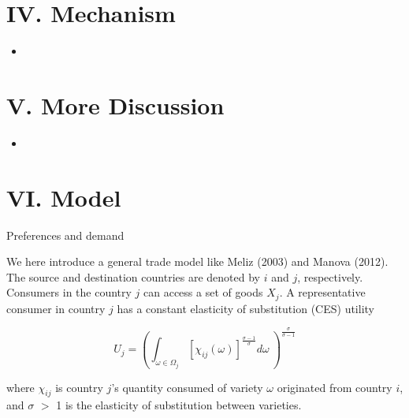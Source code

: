 \documentclass[10pt]{beamer}
\begin{document}
\section{IV. Mechanism}
\begin{frame}{}
\begin{itemize}
    \item 
    \medskip

\end{itemize}
\end{frame}

\section{V. More Discussion}
\begin{frame}{}
\begin{itemize}
    \item 
    \medskip

\end{itemize}
\end{frame}

\section{VI. Model}

\begin{frame}{Preferences and demand}

We here introduce a general trade model like Meliz (2003) and Manova (2012). The source and destination countries are denoted by $i$ and $j$, respectively. Consumers in the country $j$ can access a set of goods $X_j$. A representative consumer in country $j$ has a constant elasticity of substitution (CES) utility

\begin{equation}
U_j=(\int_{\omega \in \Omega_j} [\chi_{ij}(\omega)]^{\frac{\sigma-1}{\sigma}} d\omega\ )^\frac{\sigma}{\sigma-1}
\end{equation}

where $\chi_{ij}$ is country $j$’s quantity consumed of variety $\omega$ originated from country $i$, and $\sigma$ $>$ 1 is the elasticity of substitution between varieties. 

\end{frame}
\end{document}
